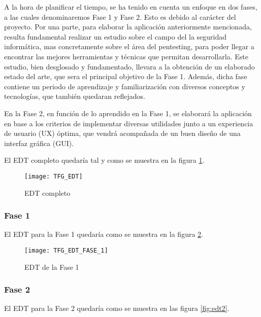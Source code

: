 A la hora de planificar el tiempo, se ha tenido en cuenta un enfoque en dos fases, a las cuales denominaremos Fase 1 y Fase 2. Esto es debido al carácter del proyecto. Por una parte, para elaborar la aplicación anteriormente mencionada, resulta fundamental realizar un estudio sobre el campo del la seguridad informática, mas concretamente sobre el área del pentesting, para poder llegar a encontrar las mejores herramientas y técnicas que permitan desarrollarla. Este estudio, bien desglosado y fundamentado, llevara a la obtención de un elaborado estado del arte, que sera el principal objetivo de la Fase 1. Además, dicha fase contiene un periodo de aprendizaje y familiarización con diversos conceptos y tecnologías, que también quedaran reflejados.

En la Fase 2, en función de lo aprendido en la Fase 1, se elaborará la aplicación en base a los criterios de implementar diversas utilidades junto a un experiencia de usuario (UX) óptima, que vendrá acompañada de un buen diseño de una interfaz gráfica (GUI).

El EDT completo quedaría tal y como se muestra en la figura \ref{fig:edt}.



\begin{landscape}
	
	\begin{figure}[H]
		\centering
		\texttt{[image: TFG\_EDT]}
		\caption{EDT completo}
		\label{fig:edt}
	\end{figure}
	
	\clearpage
	
	\subsubsection{Fase 1}
	El EDT para la Fase 1 quedaría como se muestra en la figura \ref{fig:edt1}.
	
	\begin{figure}[H]
		\centering
		\texttt{[image: TFG\_EDT\_FASE\_1]}
		\caption{EDT de la Fase 1}
		\label{fig:edt1}
	\end{figure}

\end{landscape}

\subsubsection{Fase 2}
El EDT para la Fase 2 quedaría como se muestra en las figura \ref{fig:edt2}.

